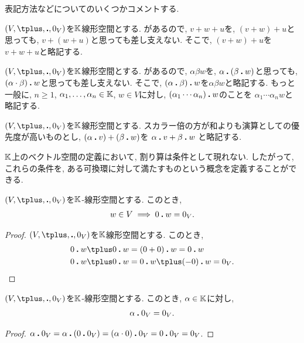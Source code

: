 表記方法などについてのいくつかコメントする.
\begin{remark}
$(V,\plus,\act,0_V)$を$\mathbb{K}$線形空間とする.
があるので, $v\plus w\plus u$を, $(v\plus w)\plus u$と思っても,
$v\plus (w\plus u)$と思っても差し支えない.
そこで, $(v\plus w)\plus u$を$v\plus w\plus u$と略記する.
\end{remark}
\begin{remark}
$(V,\plus,\act,0_V)$を$\mathbb{K}$線形空間とする.
があるので, $\alpha \beta w$を, $\alpha\mathbin{\boldsymbol{.}} (\beta\mathbin{\boldsymbol{.}} w)$と思っても,
$(\alpha\cdot\beta)\mathbin{\boldsymbol{.}} w$と思っても差し支えない.
そこで, $(\alpha\mathbin{\boldsymbol{.}} \beta)\mathbin{\boldsymbol{.}} w$を$\alpha \beta w$と略記する.
もっと一般に, $n\geq 1$, $\alpha_1,\ldots,\alpha_n\in\mathbb{K}$, $w\in V$に対し,
$(\alpha_1\cdots \alpha_n)\mathbin{\boldsymbol{.}} w$のことを
$\alpha_1\cdots \alpha_n w$と略記する.
\end{remark}
\begin{remark}
$(V,\plus,\act,0_V)$を$\mathbb{K}$線形空間とする.
スカラー倍の方が和よりも演算としての優先度が高いものとし,
$(\alpha\mathbin{\boldsymbol{.}} v)+(\beta\mathbin{\boldsymbol{.}} w)$を
$\alpha\mathbin{\boldsymbol{.}} v+\beta\mathbin{\boldsymbol{.}} w$
と略記する.
\end{remark}
\begin{remark}
  $\mathbb{K}$上のベクトル空間の定義において,
  割り算は条件として現れない.
  したがって,
  これらの条件を, ある可換環に対して満たすものという概念を定義することができる.
\end{remark}
\begin{prop}
  \label{prop:zeroveciszeroscalar}
  $(V,\plus ,\act ,0_V)$を$\mathbb{K}$-線形空間とする.
  このとき,
  \begin{align*}
    w\in V \implies 0\mathbin{\boldsymbol{.}} w=0_V. 
  \end{align*}
\end{prop}
\begin{proof}
$(V,\plus,\act,0_V)$を$\mathbb{K}$線形空間とする.
  このとき,
  \begin{align*}
    0\act w\plus 0\act w&=(0+0)\act w=0\act w\\
    0\act w\plus 0\act w&=0\act w\plus (-0)\act w=0_V.
  \end{align*}
\end{proof}
\begin{prop}
$(V,\plus ,\act ,0_V)$を$\mathbb{K}$-線形空間とする.
このとき, $\alpha \in\mathbb{K}$に対し,
\begin{align*}
\alpha \mathbin{\boldsymbol{.}} 0_V = 0_V.
\end{align*}
\end{prop}
\begin{proof}
$\alpha \mathbin{\boldsymbol{.}} 0_V = \alpha \mathbin{\boldsymbol{.}} (0\mathbin{\boldsymbol{.}} 0_V)= (\alpha \cdot 0)\mathbin{\boldsymbol{.}} 0_V=0\mathbin{\boldsymbol{.}} 0_V=0_V$.
\end{proof}


